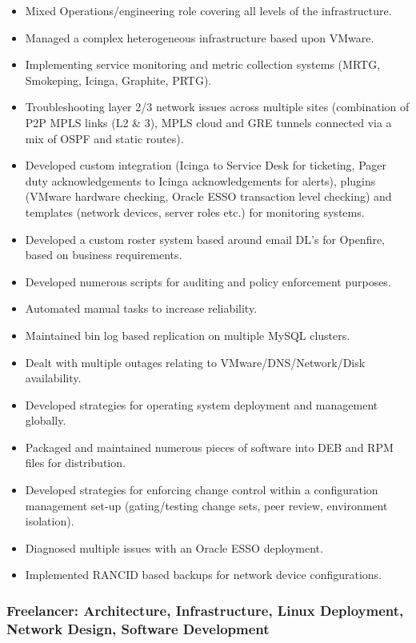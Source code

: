 \begin{itemize}
\itemsep1pt\parskip0pt
\item
  Mixed Operations/engineering role covering all levels of the
  infrastructure.
\item
  Managed a complex heterogeneous infrastructure based upon VMware.
\item
  Implementing service monitoring and metric collection systems (MRTG,
  Smokeping, Icinga, Graphite, PRTG).
\item
  Troubleshooting layer 2/3 network issues across multiple sites
  (combination of P2P MPLS links (L2 \& 3), MPLS cloud and GRE tunnels
  connected via a mix of OSPF and static routes).
\item
  Developed custom integration (Icinga to Service Desk for ticketing,
  Pager duty acknowledgements to Icinga acknowledgements for alerts),
  plugins (VMware hardware checking, Oracle ESSO transaction level
  checking) and templates (network devices, server roles etc.) for
  monitoring systems.
\item
  Developed a custom roster system based around email DL's for Openfire,
  based on business requirements.
\item
  Developed numerous scripts for auditing and policy enforcement
  purposes.
\item
  Automated manual tasks to increase reliability.
\item
  Maintained bin log based replication on multiple MySQL clusters.
\item
  Dealt with multiple outages relating to VMware/DNS/Network/Disk
  availability.
\item
  Developed strategies for operating system deployment and management
  globally.
\item
  Packaged and maintained numerous pieces of software into DEB and RPM
  files for distribution.
\item
  Developed strategies for enforcing change control within a
  configuration management set-up (gating/testing change sets, peer
  review, environment isolation).
\item
  Diagnosed multiple issues with an Oracle ESSO deployment.
\item
  Implemented RANCID based backups for network device configurations.
\end{itemize}

\subsubsection{Freelancer: Architecture, Infrastructure, Linux
Deployment, Network Design, Software
Development}\label{freelancer-architecture-infrastructure-linux-deployment-network-design-software-development}

